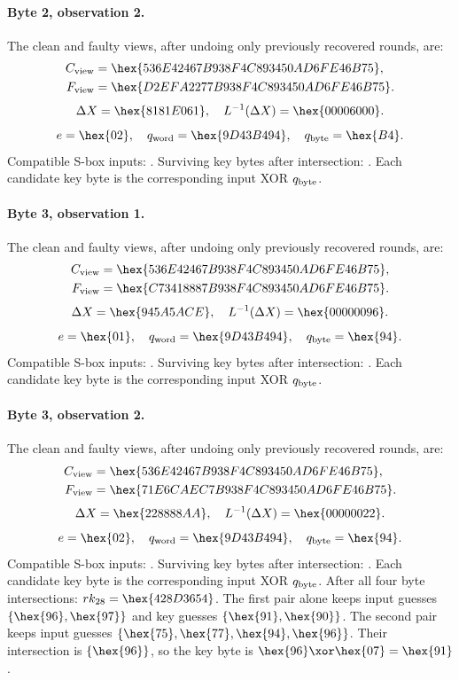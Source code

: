 \paragraph{Byte 2, observation 2.}
The clean and faulty views, after undoing only previously recovered rounds, are:
\[\begin{aligned}C_{\rm view}&=\hex{536E42467B938F4C893450AD6FE46B75},\\F_{\rm view}&=\hex{D2EFA2277B938F4C893450AD6FE46B75}.\end{aligned}\]
\[\Delta X=\hex{8181E061},\quad L^{-1}(\Delta X)=\hex{00006000}.\]
\[e=\hex{02},\quad q_{\rm word}=\hex{9D43B494},\quad q_{\rm byte}=\hex{B4}.\]
Compatible S-box inputs: . Surviving key bytes after intersection: . Each candidate key byte is the corresponding input XOR $q_{\rm byte}$.
\paragraph{Byte 3, observation 1.}
The clean and faulty views, after undoing only previously recovered rounds, are:
\[\begin{aligned}C_{\rm view}&=\hex{536E42467B938F4C893450AD6FE46B75},\\F_{\rm view}&=\hex{C73418887B938F4C893450AD6FE46B75}.\end{aligned}\]
\[\Delta X=\hex{945A5ACE},\quad L^{-1}(\Delta X)=\hex{00000096}.\]
\[e=\hex{01},\quad q_{\rm word}=\hex{9D43B494},\quad q_{\rm byte}=\hex{94}.\]
Compatible S-box inputs: . Surviving key bytes after intersection: . Each candidate key byte is the corresponding input XOR $q_{\rm byte}$.
\paragraph{Byte 3, observation 2.}
The clean and faulty views, after undoing only previously recovered rounds, are:
\[\begin{aligned}C_{\rm view}&=\hex{536E42467B938F4C893450AD6FE46B75},\\F_{\rm view}&=\hex{71E6CAEC7B938F4C893450AD6FE46B75}.\end{aligned}\]
\[\Delta X=\hex{228888AA},\quad L^{-1}(\Delta X)=\hex{00000022}.\]
\[e=\hex{02},\quad q_{\rm word}=\hex{9D43B494},\quad q_{\rm byte}=\hex{94}.\]
Compatible S-box inputs: . Surviving key bytes after intersection: . Each candidate key byte is the corresponding input XOR $q_{\rm byte}$.
After all four byte intersections: $rk_{28}=\hex{428D3654}$.
The first pair alone keeps input guesses $\{\hex{96},\hex{97}\}$ and key guesses $\{\hex{91},\hex{90}\}$. The second pair keeps input guesses $\{\hex{75},\hex{77},\hex{94},\hex{96}\}$. Their intersection is $\{\hex{96}\}$, so the key byte is $\hex{96}\xor\hex{07}=\hex{91}$.
